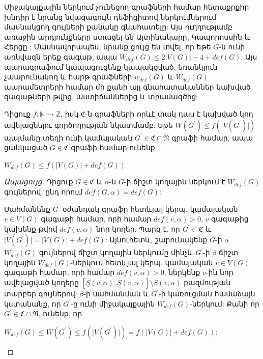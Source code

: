 Միջակայքային ներկում չունեցող գրաֆների համար հետաքրքիր խնդիր է նրանց նվազագույն դեֆիցիտով ներկումներում մասնակցող գույների քանակը գնահատելը: Այս ուղղությամբ առաջին արդյունքները ստացել են Ալտինակարը, Կապորոսսին և Հերցը \cite{AltinakarCaporossiHertz}: Մասնավորապես, նրանք ցույց են տվել, որ եթե $G$-ն ունի առնվազն երեք գագաթ, ապա $W_{def}(G)\leq 2\vert V(G)\vert -4+def(G)$: Այս պարագրաֆում կապացուցենք կապակցված, եռանկյուն չպարունակող և հարթ գրաֆների $w_{def}(G)$ և $W_{def}(G)$ պարամետրերի համար մի քանի այլ գնահատականներ կախված գագաթների թվից, աստիճաններից և տրամագծից:

\begin{theorem}
\label{t3_W_Wdef} Դիցուք $f:\mathbb{N} \rightarrow \mathbb{Z}$, իսկ $\mathfrak{C}$-ն գրաֆների որևէ փակ դաս է կախված կող ավելացնելու գործողության նկատմամբ: Եթե
$W(G^{\prime})\leq
f(\vert V(G^{\prime})\vert)$ պայմանը տեղի ունի կամայական $G^{\prime}\in
\mathfrak{C} \cap \mathfrak{N}$ գրաֆի համար, ապա ցանկացած $G\in \mathfrak{C}$ գրաֆի համար ունենք
\begin{center}
$W_{def}(G)\leq f\left(\vert V(G)\vert+def(G)\right)$
\end{center}
\end{theorem}
\begin{proof}[Ապացույց]
Դիցուք $G\in \mathfrak{C}$ և $\alpha$-ն $G$-ի ճիշտ կողային ներկում է $W_{def}(G)$ գույներով, ընդ որում $def(G,\alpha)=def(G)$:

Սահմանենք $G^{\prime}$ օժանդակ գրաֆը հետևյալ կերպ. կամայական $v\in V(G)$ գագաթի համար, որի համար $def(v,\alpha)>0$, $v$ գագաթից կախենք թվով $def(v,\alpha)$ նոր կողեր: Պարզ է, որ $G^{\prime}\in\mathfrak{C}$ և $\vert V(G^{\prime})\vert = \vert V(G)\vert +def(G)$: Այնուհետև, շարունակենք $G$-ի $\alpha$ $W_{def}(G)$ գույներով ճիշտ կողային ներկումը մինչև $G^{\prime}$-ի $\beta$ ճիշտ կողային $W_{def}(G)$-ներկում հետևյալ կերպ. կամայական $v\in V(G)$ գագաթի համար, որի համար $def(v,\alpha)>0$, ներկենք $v$-ին նոր ավելացված կողերը $\left[\underline
S\left(v,\alpha \right),\overline S\left(v,\alpha
\right)\right]\setminus S(v,\alpha)$ բազմության տարբեր գույներով: $\beta$-ի սահմանման և $G^{\prime}$-ի կառուցման համաձայն կստանանք, որ $G^{\prime}$-ը ունի միջակայքային $W_{def}(G)$-ներկում: Քանի որ $G^{\prime}\in \mathfrak{C}\cap\mathfrak{N}$, ունենք, որ
\begin{center}
$W_{def}(G)\leq W(G^{\prime})\leq f(\vert V(G^{\prime})\vert)= f\left(\vert V(G)\vert+def(G)\right)$:
\end{center}
\end{proof}

